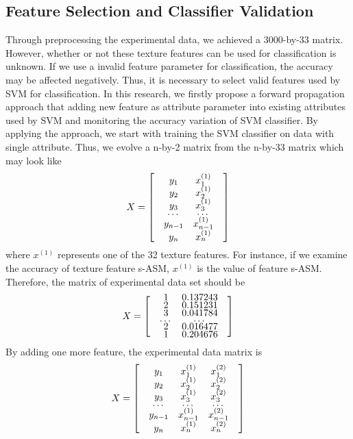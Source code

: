 \subsection{Feature Selection and Classifier Validation}
Through preprocessing the experimental data, we achieved a 3000-by-33 matrix. However, whether or not these texture features can be used for classification is unknown. If we use a invalid feature parameter for classification, the accuracy may be affected negatively. Thus, it is necessary to select valid features used by SVM for classification. In this research, we firstly propose a forward propagation approach that adding new feature as attribute parameter into existing attributes used by SVM and monitoring the accuracy variation of SVM classifier. By applying the approach, we start with training the SVM classifier on data with single attribute. Thus, we evolve a n-by-2 matrix from the n-by-33 matrix which may look like
\begin{align*}
X = 
\renewcommand{\arraystretch}{0.5}
\begin{bmatrix}
 & y_1 & x_1^{(1)} & \\
 & y_2 & x_2^{(1)} & \\
 & y_3 & x_3^{(1)} & \\
 & $\ldots$ & $\ldots$ \\
 & y_{n-1} & x_{n-1}^{(1)} & \\
 & y_n & x_n^{(1)} & \\
\end{bmatrix}
\end{align*}
where $x^{(1)}$ represents one of the 32 texture features. For instance, if we examine the accuracy of texture feature s-ASM, $x^{(1)}$ is the value of feature s-ASM. Therefore, the matrix of experimental data set should be 
\begin{align*}
X = 
\renewcommand{\arraystretch}{0.5}
\begin{bmatrix}
 & 1 & 0.137243 & \\
 & 2 & 0.151231 & \\
 & 3 & 0.041784 & \\
 & $\ldots$ & $\ldots$ \\
 & 2 & 0.016477 & \\
 & 1 & 0.204676 & \\
\end{bmatrix}
\end{align*}
By adding one more feature, the experimental data matrix is 
\begin{align*}
X = 
\renewcommand{\arraystretch}{0.5}
\begin{bmatrix}
 & y_1 & x_1^{(1)} & x_1^{(2)} &\\
 & y_2 & x_2^{(1)} & x_2^{(2)} &\\
 & y_3 & x_3^{(1)} & x_3^{(2)} &\\
 & $\ldots$ & $\ldots$ & $\ldots$\\
 & y_{n-1} & x_{n-1}^{(1)} & x_{n-1}^{(2)} &\\
 & y_n & x_n^{(1)} & x_n^{(2)} &\\
\end{bmatrix}
\end{align*}
